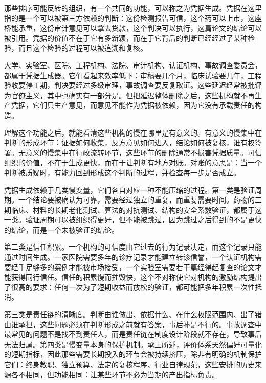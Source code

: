 
那些排序可能反转的组织，有一个共同的功能，可以称之为凭据生成。凭据在这里指的是一个可以被第三方依赖的判断：这份检测报告可信，这个药可以上市，这座桥能承重，这份审计意见可以拿去贷款，这个判决可以执行，这篇论文的结论可以被引用。凭据的价值不在于它有多新颖，而在于它背后的判断已经经过了某种检验，而且这个检验的过程可以被追溯和复核。

大学、实验室、医院、工程机构、法院、审计机构、认证机构、事故调查委员会，都属于凭据生成器。它们看起来效率低下：审稿要几个月，临床试验要几年，工程验收要停工期，判决要经过多级审理，事故调查要反复取证。这些延迟经常被批评为官僚主义，其中也确实有一部分是。但把延迟整体删除之后，这些机构就不再生产凭据，它们只生产意见，而意见不能作为凭据被依赖，因为它没有承载责任的构造。

理解这个功能之后，就能看清这些机构的慢在哪里是有意义的。有意义的慢集中在判断的形成环节：证据如何收集，反方意见如何进入，结论如何被复核，谁有权签署。无意义的慢集中在行政流转环节，这些环节的删除通常不损害凭据质量。可信组织的价值，不在于生成更快，而在于让判断有地方对账。对账的意思是：当一个判断被质疑时，有能力回到形成这个判断的过程，并检查每一步是否成立。


凭据生成依赖于几类慢变量，它们各自对应一种不能压缩的过程。第一类是验证周期。一个结论要被确认为可靠，需要经过独立的重复，而重复需要时间。药物的三期临床、材料的长期老化测试、算法的对抗测试、结构的安全系数验证，都属于这一类。验证周期可以被组织得更好，但不能被跳过，因为跳过之后得到的不是更快的结论，而是一个未被验证的结论。

第二类是信任积累。一个机构的可信度由它过去的行为记录决定，而这个记录只能通过时间生成。一家医院需要多年的诊疗记录才能建立转诊信誉，一个认证机构需要经手足够多的案例才能被市场接受，一个实验室需要若干篇经得起复查的论文才能获得同行信任。信任的积累慢而摧毁快，这个不对称使它对机构的激励结构提出了很高的要求：任何一次为了短期收益而放松的验证，都可能把多年积累一次性抵消。

第三类是责任链的清晰度。判断由谁做出、依据什么、在什么权限范围内、出了错由谁承担，这些问题必须在判断形成之前就有答案，事后补是不行的。事故调查中最常见的问题不是找不到责任人，而是责任链在制度设计阶段就不存在，导致事后无法归属。第四类是慢变量本身的保护机制。承上所述，评价体系天然偏好可量化的短期指标，因此那些需要长期投入的环节会被持续挤压，除非有明确的机制保护它们：终身教职、独立预算、法定的复核程序、行业自律规范，这些安排的历史来源各不相同，但功能相同：让某些环节不必为当期的产出指标负责。


